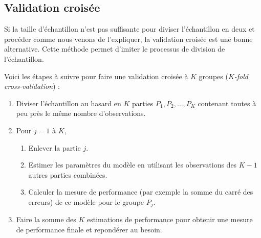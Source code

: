 \documentclass[
  11pt,
  letterpaper,
]{book}
\providecommand{\tightlist}{%
  \setlength{\itemsep}{0pt}\setlength{\parskip}{0pt}}
\theoremstyle{definition}
\theoremstyle{definition}
\theoremstyle{definition}
\theoremstyle{remark}
\begin{document}
\hypertarget{validation-croisuxe9e}{%
\subsection{Validation croisée}\label{validation-croisuxe9e}}

Si la taille d'échantillon n'est pas suffisante pour diviser l'échantillon en deux et procéder comme nous venons de l'expliquer, la validation croisée est une bonne alternative. Cette méthode permet d'imiter le processus de division de l'échantillon.

Voici les étapes à suivre pour faire une validation croisée à \(K\) groupes (\emph{\(K\)-fold cross-validation}) :

\begin{enumerate}
\def\labelenumi{\arabic{enumi}.}
\tightlist
\item
  Diviser l'échantillon au hasard en \(K\) parties \(P_1, P_2, \ldots, P_K\) contenant toutes à peu près le même nombre d'observations.
\item
  Pour \(j = 1\) à \(K\),

  \begin{enumerate}
  \def\labelenumii{\roman{enumii}.}
  \tightlist
  \item
    Enlever la partie \(j\).
  \item
    Estimer les paramètres du modèle en utilisant les observations des \(K-1\) autres parties combinées.
  \item
    Calculer la mesure de performance (par exemple la somme du carré des erreurs) de ce modèle pour le groupe \(P_j\).
  \end{enumerate}
\item
  Faire la somme des \(K\) estimations de performance pour obtenir une mesure de performance finale et repondérer au besoin.
\end{enumerate}
\end{document}
